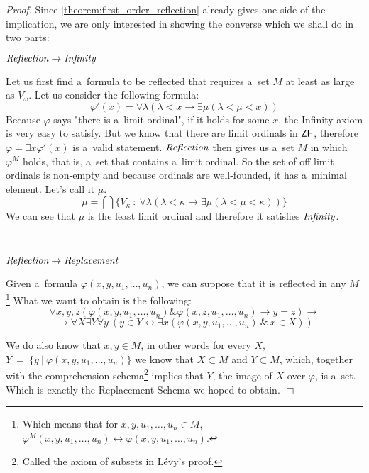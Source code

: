 \documentclass[12pt,a4paper]{article}
\newenvironment{proof}
{\noindent \textit{Proof.}}
{\hspace*{\fill} $\Box$}
\renewcommand{\iff}{\leftrightarrow}
\newcommand{\then}{\rightarrow}
\begin{document}
\begin{proof}
Since \ref{theorem:first_order_reflection} already gives one side of the implication, we are only interested in showing the converse which we shall do in two parts:

$\bold{\emph{Reflection} \then \emph{Infinity}}$

Let us first find a~formula to be reflected that requires a~set $M$ at least as large as $V_\omega$.
Let us consider the following formula:
\begin{equation}
\varphi'(x) = \forall \lambda(\lambda < x \then \exists \mu(\lambda < \mu < x))
\end{equation}
Because $\varphi$ says "there is a~limit ordinal", if it holds for some $x$, the Infinity axiom is very easy to satisfy. But we know that there are limit ordinals in $\sf{ZF}$, therefore $\varphi = \exists x \varphi'(x)$ is a~valid statement. $\emph{Reflection}$ then gives us a~set $M$ in which $\varphi^M$ holds, that is, a~set that contains a~limit ordinal. So the set of off limit ordinals is non-empty and because ordinals are well-founded, it has a~minimal element. Let's call it $\mu$.
\begin{equation} %
\mu = \bigcap \{V_\kappa\ :\  \forall \lambda(\lambda < \kappa \then \exists \mu(\lambda < \mu < \kappa))\}
\end{equation}
We can see that $\mu$ is the least limit ordinal and therefore it satisfies $\emph{Infinity}$.

\

$\bold{\emph{Reflection} \then \emph{Replacement}}$

Given a~formula $\varphi(x, y, u_1, \ldots, u_n)$, we can suppose that it is reflected in any $M$ \footnote{Which means that for $x, y, u_1, \ldots, u_n \in M$, $\varphi^M(x, y, u_1, \ldots, u_n) \iff \varphi(x, y, u_1, \ldots, u_n)$.}
What we want to obtain is the following:
\begin{equation}
\forall x, y, z (\varphi(x, y, u_1, \ldots, u_n) \& \varphi(x, z, u_1, \ldots, u_n) \then y = z) \then
\end{equation}
\begin{equation}
\then \forall X \exists Y \forall y\ (y \in Y \iff \exists x (\varphi(x, y, u_1, \ldots, u_n)\ \&\ x \in X ))
\end{equation}

We do also know that $x, y \in M$, in other words for every $X$, $Y\ =\ \{y\ |\ \varphi(x, y, u_1, \ldots, u_n)\}$ we know that $X \subset M$ and $Y \subset M$, which, together with the comprehension schema\footnote{Called the axiom of subsets in Lévy's proof.} implies that $Y$, the image of $X$ over $\varphi$, is a~set.
Which is exactly the Replacement Schema we hoped to obtain.
\end{proof}
\end{document}
